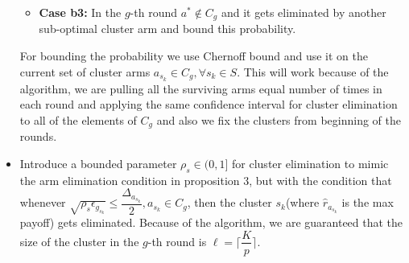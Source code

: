\begin{remark}
\begin{itemize}
\begin{itemize}
\item \textbf{Case b3:} In the $g$-th round $a^{*}\notin C_{g}$ and it gets eliminated by another sub-optimal cluster arm  and bound this probability.
\end{itemize}
For bounding the probability we use Chernoff bound and use it on the current set of cluster arms $a_{s_{k}}\in C_{g},\forall s_{k}\in S$. This will work because of the algorithm, we are pulling all the  surviving arms equal number of times in each round and applying the same confidence interval for cluster elimination to all of the elements of $C_{g}$ and also we fix the clusters from beginning of the rounds.
\item Introduce a bounded parameter $\rho_{s}\in (0,1]$ for cluster elimination to mimic the arm elimination condition in proposition $3$, but with the condition that whenever $\sqrt{\rho_{s}\epsilon_{g_{s_{k}}}}\leq \dfrac{\Delta_{a_{s_{k}}}}{2}, a_{s_{k}}\in C_{g}$, then the cluster $s_{k}$(where $\hat{r}_{a_{s_{k}}}$ is the max payoff) gets eliminated. Because of the algorithm, we are guaranteed that the size of the cluster in the $g$-th round is $\ell=\bigg\lceil \dfrac{K}{p}\bigg\rceil$.
\end{itemize}
\end{remark}


